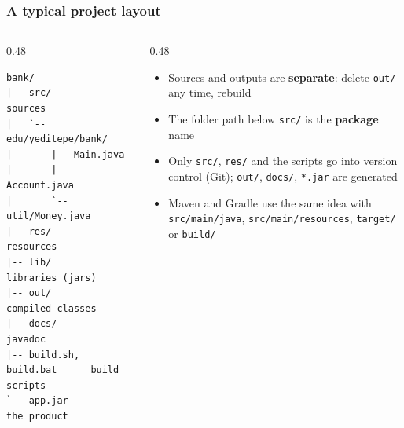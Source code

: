 \documentclass[aspectratio=169,10pt,compress]{beamer}
\begin{document}
\begin{frame}[t,fragile] \frametitle{A typical project layout}
  \begin{columns}[T]
    \begin{column}{0.48\textwidth}


\begin{lstlisting}[style=codesnippet, language={}, basicstyle=\ttfamily\scriptsize]
bank/
|-- src/                     sources
|   `-- edu/yeditepe/bank/
|       |-- Main.java
|       |-- Account.java
|       `-- util/Money.java
|-- res/                     resources
|-- lib/                     libraries (jars)
|-- out/                     compiled classes
|-- docs/                    javadoc
|-- build.sh, build.bat      build scripts
`-- app.jar                  the product
\end{lstlisting}



    \end{column}
    \begin{column}{0.48\textwidth}
      \begin{itemize}\small
        \item Sources and outputs are \textbf{separate}: delete \texttt{out/} any time, rebuild
        \item The folder path below \texttt{src/} is the \textbf{package} name
        \item Only \texttt{src/}, \texttt{res/} and the scripts go into version control (Git); \texttt{out/}, \texttt{docs/}, \texttt{*.jar} are generated
        \item Maven and Gradle use the same idea with \texttt{src/main/java}, \texttt{src/main/resources}, \texttt{target/} or \texttt{build/}
      \end{itemize}
    \end{column}
  \end{columns}
\end{frame}
\end{document}

